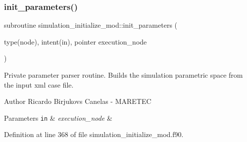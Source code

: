\mbox{\label{namespacesimulation__initialize__mod_a4ee29d81788bb77840a67af18784da66}} 
\subsubsection{\texorpdfstring{init\+\_\+parameters()}{init\_parameters()}}
{\footnotesize\ttfamily subroutine simulation\+\_\+initialize\+\_\+mod\+::init\+\_\+parameters (\begin{DoxyParamCaption}\item[{type(node), intent(in), pointer}]{execution\+\_\+node }\end{DoxyParamCaption})\hspace{0.3cm}{\ttfamily [private]}}



Private parameter parser routine. Builds the simulation parametric space from the input xml case file. 

\begin{DoxyAuthor}{Author}
Ricardo Birjukovs Canelas -\/ M\+A\+R\+E\+T\+EC 
\end{DoxyAuthor}

\begin{DoxyParams}[1]{Parameters}
\mbox{\tt in}  & {\em execution\+\_\+node} & \\
\hline
\end{DoxyParams}


Definition at line 368 of file simulation\+\_\+initialize\+\_\+mod.\+f90.



